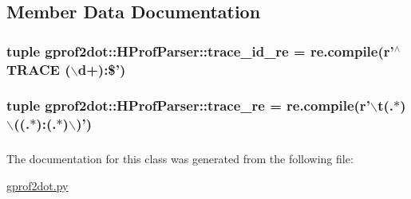 \subsection{Member Data Documentation}
\hypertarget{classgprof2dot_1_1HProfParser_a3c0310fc0ef8b98ae09fa94f36f116d5}{
\subsubsection[{samples}]{}}
\label{classgprof2dot_1_1HProfParser_a3c0310fc0ef8b98ae09fa94f36f116d5}
\hypertarget{classgprof2dot_1_1HProfParser_a299919246c94ae17e7293fd9908ab071}{
\subsubsection[{trace\_\-id\_\-re}]{\setlength{\rightskip}{0pt plus 5cm}tuple {\bf gprof2dot::HProfParser::trace\_\-id\_\-re} = re.compile(r'$^\wedge$TRACE ($\backslash$d+):\$')}}
\label{classgprof2dot_1_1HProfParser_a299919246c94ae17e7293fd9908ab071}
\hypertarget{classgprof2dot_1_1HProfParser_af71eae81a0a57ed7b7210364ee666679}{
\subsubsection[{trace\_\-re}]{\setlength{\rightskip}{0pt plus 5cm}tuple {\bf gprof2dot::HProfParser::trace\_\-re} = re.compile(r'$\backslash$t(.$\ast$)$\backslash$((.$\ast$):(.$\ast$)$\backslash$)')}}
\label{classgprof2dot_1_1HProfParser_af71eae81a0a57ed7b7210364ee666679}
\hypertarget{classgprof2dot_1_1HProfParser_af9da484ae6aff23799453b827b926289}{
\subsubsection[{traces}]{}}
\label{classgprof2dot_1_1HProfParser_af9da484ae6aff23799453b827b926289}


The documentation for this class was generated from the following file:\begin{DoxyCompactItemize}
\item 
\hyperlink{gprof2dot_8py}{gprof2dot.py}\end{DoxyCompactItemize}
